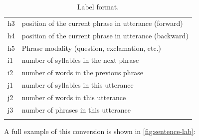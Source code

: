 \begin{longtable}[!htpb]{p{} p{}}
h3 & position of the current phrase in utterance (forward) \\
h4 & position of the current phrase in utterance (backward) \\
h5 & Phrase modality (question, exclamation, etc.)\\
\midrule
i1 & number of syllables in the next phrase \\
i2 & number of words in the previous phrase \\
\midrule
j1 & number of syllables in this utterance \\
j2 & number of words in this utterance \\
j3 & number of phrases in this utterance \\
\bottomrule
\caption{\label{table:lab_format}Label format.}\\
\end{longtable}
\doublespacing


A full example of this conversion is shown in \ref{fig:sentence-lab}:


